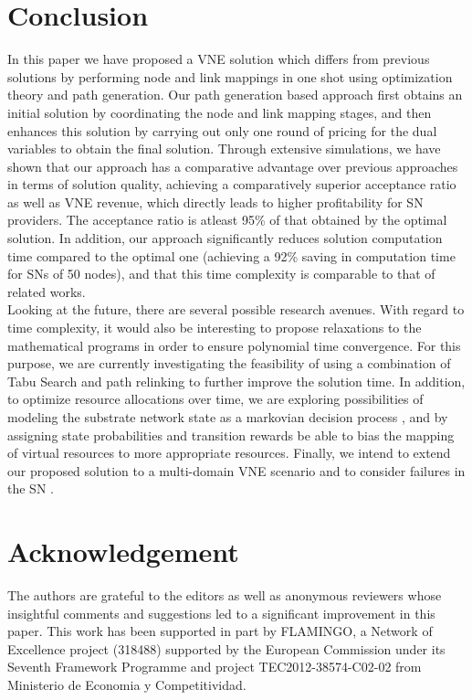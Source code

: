 \documentclass[journal]{IEEEtran}
\begin{document}
\section{Conclusion}
In this paper we have proposed a \ac{VNE} solution which differs from previous solutions by performing node and link mappings in one shot using optimization theory and path generation. Our path generation based approach first obtains an initial solution by coordinating the node and link mapping stages, and then enhances this solution by carrying out only one round of pricing for the dual variables to obtain the final solution. Through extensive simulations, we have shown that our approach has a comparative advantage over previous approaches in terms of solution quality, achieving a comparatively superior acceptance ratio as well as \ac{VNE} revenue, which directly leads to higher profitability for \ac{SN} providers. The acceptance ratio is atleast 95\% of that obtained by the optimal solution. In addition, our approach significantly reduces solution computation time compared to the optimal one (achieving a 92\% saving in computation time for \acp{SN} of 50 nodes), and that this time complexity is comparable to that of related works.\\
\indent Looking at the future, there are several possible research avenues. With regard to time complexity, it would also be interesting to propose relaxations to the mathematical programs in order to ensure polynomial time convergence. For this purpose, we are currently investigating the feasibility of using a combination of Tabu Search and path relinking to further improve the solution time. In addition, to optimize resource allocations over time, we are exploring possibilities of modeling the substrate network state as a markovian decision process \cite{RossKW95}, and by assigning state probabilities and transition rewards be able to bias the mapping of virtual resources to more appropriate resources. Finally, we intend to extend our proposed solution to a multi-domain \ac{VNE} scenario \cite{MChowdhury10} and to consider failures in the \ac{SN} \cite{MijuSurv14, ZilongYe14}.

\section*{Acknowledgement}
The authors are grateful to the editors as well as anonymous reviewers whose insightful comments and suggestions led to a significant improvement in this paper. This work has been supported in part by FLAMINGO, a Network of Excellence project (318488) supported by the European Commission under its Seventh Framework Programme and project TEC2012-38574-C02-02 from Ministerio de Economia y Competitividad.
\end{document}
